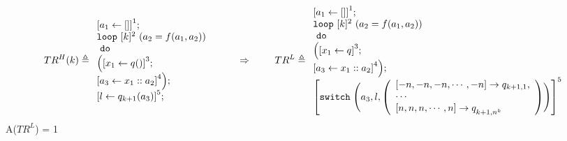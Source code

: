 \documentclass[a4paper,11pt]{article}
\begin{document}
%
%
\begin{example}
\[
TR^H(k) \triangleq
{
\begin{array}{l}
    \left[a_1 \leftarrow [] \right]^1; \\
    \eloop ~ [k]^{2} ~ (a_2 = f(a_1, a_2)) \\ 
    ~ \edo ~ \\ 
    \Big( 
     \left[x_1 \leftarrow q() \right]^3 ; \\
    \left[a_3 \leftarrow x_1 :: a_2 \right]^4
    \Big);\\
    \clabel{l \leftarrow q_{k + 1}(a_3)}^5;\\
\end{array}
}
%
~~~~~~~~ \Rightarrow ~~~~~~~
%
TR^L \triangleq
\begin{array}{l}
    \left[a_1 \leftarrow [] \right]^1; \\
   \eloop ~ [k]^{2} ~ (a_2 = f(a_1, a_2)) \\
    ~ \edo ~ \\
   \Big( 
     \left[x_1 \leftarrow q \right]^3; \\
    \left[a_3 \leftarrow x_1 :: a_2 \right]^4 
    \Big);\\
    \clabel{
\eswitch \Bigg(a_3, l, 
    \left(\begin{array}{l}
    \left[-n, -n, -n, \cdots, -n\right] \to q_{k + 1,1},\\
    \cdots\\
    \left[n, n, n, \cdots, n\right] \to q^{}_{k + 1, n^k}
\end{array} \right) \Bigg)
    }^5
\end{array}
\]
A($TR^L$) = 1


\end{example}
\end{document}
